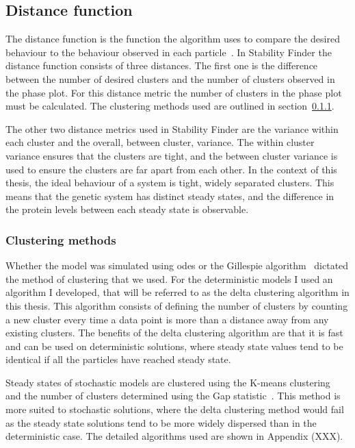 \subsection{Distance function}
\label{sec:dist}
 The distance function is the function the algorithm uses to compare the desired behaviour to the behaviour observed in each particle~\autocite{Toni:2009tr}. In Stability Finder the distance function consists of three distances. The first one is the difference between the number of desired clusters and the number of clusters observed in the phase plot. For this distance metric the number of clusters in the phase plot must be calculated. The clustering methods used are outlined in section~\ref{Clustering methods}.
 
 The other two distance metrics used in Stability Finder are the variance within each cluster and the overall, between cluster, variance. The within cluster variance ensures that the clusters are tight, and the between cluster variance is used to ensure the clusters are far apart from each other. In the context of this thesis, the ideal behaviour of a system is tight, widely separated clusters. This means that the genetic system has distinct steady states, and the difference in the protein levels between each steady state is observable.
 
\subsubsection{Clustering methods}
\label{Clustering methods}

Whether the model was simulated using \acrshort{ode}s or the Gillespie algorithm~\autocite{Gillespie:1977ww} dictated the method of clustering that we used. For the deterministic models I used an algorithm I developed, that will be referred to as the delta clustering algorithm in this thesis. This algorithm consists of defining the number of clusters by counting a new cluster every time a data point is more than a distance \textdelta{} away from any existing clusters. The benefits of the delta clustering algorithm are that it is fast and can be used on deterministic solutions, where steady state values tend to be identical if all the particles have reached steady state.

Steady states of stochastic models are clustered using the K-means clustering~\autocite{Lloyd:1982wn} and the number of clusters determined using the Gap statistic~\autocite{Tibshirani:2001vo}. This method is more suited to stochastic solutions, where the delta clustering method would fail as the steady state solutions tend to be more widely dispersed than in the deterministic case. The detailed algorithms used are shown in Appendix (XXX). 

